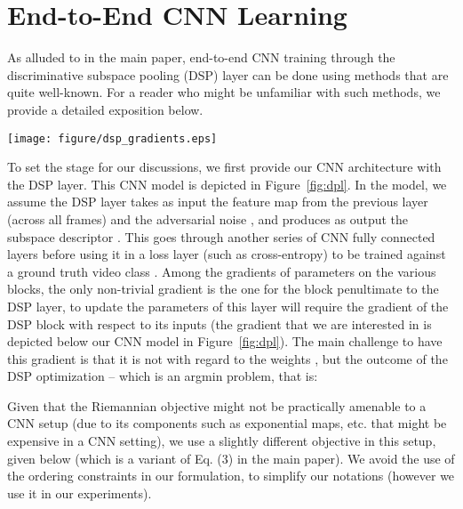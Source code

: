 \documentclass[runningheads]{llncs}
\begin{document}
\section{End-to-End CNN Learning}
\label{sec:end-to-end}
As alluded to in the main paper, end-to-end CNN training through the discriminative subspace pooling (DSP) layer can be done using methods that are quite well-known. For a reader who might be unfamiliar with such methods, we provide a detailed exposition below. 
\begin{figure*}[t]
\centering
\texttt{[image: figure/dsp\_gradients.eps]}
\caption{Architecture of our end-to-end CNN with discriminative subspace pooling (DSP) layer in between. We assume  represents the feature map outputs from the -th CNN layer (from all frames in the sequence) denoted as , and  represents its respective parameters. The final loss is shows as ,  is the softmax function, and  is the action class label. The parameter  is the subspace pooled output of the DSP layer, and  is the adversarial noise. Below the model, we provide the gradient that we are after for enabling back-propagation through the DSP layer.} 
\label{fig:dpl}
\end{figure*}
To set the stage for our discussions, we first provide our CNN architecture with the DSP layer. This CNN model is depicted in Figure~\ref{fig:dpl}. In the model, we assume the DSP layer takes as input the feature map  from the previous layer (across all frames) and the adversarial noise , and produces as output the subspace descriptor . This  goes through another series of CNN fully connected layers before using it in a loss layer  (such as cross-entropy) to be trained against a ground truth video class . Among the gradients of parameters  on the various blocks, the only non-trivial gradient is the one for the block penultimate to the DSP layer, to update the parameters  of this layer will require the gradient of the DSP block with respect to its inputs  (the gradient that we are interested in is depicted below our CNN model in Figure~\ref{fig:dpl}). The main challenge to have this gradient is that it is not with regard to the weights , but the outcome of the DSP optimization  -- which is an argmin problem, that is:


Given that the Riemannian objective might not be practically amenable to a CNN setup (due to its components such as exponential maps, etc. that might be expensive in a CNN setting), we use a slightly different objective in this setup, given below (which is a variant of Eq. (3) in the main paper). We avoid the use of the ordering constraints in our formulation, to simplify our notations (however we use it in our experiments).
\end{document}
